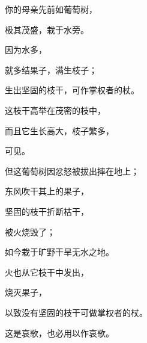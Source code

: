 {\par }{\BB \par }{\Q {}你的母亲先前如葡萄树，
\par }{\Q 极其茂盛，栽于水旁。
\par }{\Q 因为水多，
\par }{\Q 就多结果子，满生枝子；
\par }{\Q {}生出坚固的枝干，可作掌权者的杖。
\par }{\Q 这枝干高举在茂密的枝中，
\par }{\Q 而且它生长高大，枝子繁多，
\par }{可见。
\par }{\Q {}但这葡萄树因忿怒被拔出摔在地上；
\par }{\Q 东风吹干其上的果子，
\par }{\Q 坚固的枝干折断枯干，
\par }{\Q 被火烧毁了；
\par }{\Q {}如今栽于旷野干旱无水之地。
\par }{\Q {}火也从它枝干中发出，
\par }{\Q 烧灭果子，
\par }{\Q 以致没有坚固的枝干可做掌权者的杖。
\par }{\BB \par }{\Q 这是哀歌，也必用以作哀歌。

}
